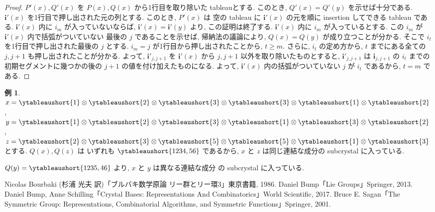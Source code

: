 \documentclass[
  a4paper, 
  12pt,
  ja=standard,
  xelatex,
  left=30truemm,
  right=30truemm,
  titlepage 
]{bxjsarticle}
\theoremstyle{definition}
\newtheorem*{ex}{例}
\begin{document}
\begin{proof}
  $P'(x), Q'(x)$ を $P(x), Q(x)$ から1行目を取り除いた tableauとする. このとき, $Q'(x) = Q'(y)$ を示せば十分である.
  $\mathbf{i}'(x)$ を1行目で押し出された元の列とする. このとき, $P'(x)$ は 空の tableau に $\mathbf{i}'(x)$ の元を順に
  insertion してできる tableau である. $\mathbf{i}'(x)$ 内に $i_m$ が入っていないならば, $\mathbf{i}'(x) = \mathbf{i}'(y)$
  より, この証明は終了する. $\mathbf{i}'(x)$ 内に $i_m$ が入っているとする. この $i_m$ が $\mathbf{i}'(x)$ 内で括弧がついていない
  最後の $j$ であることを示せば, 帰納法の議論により, $Q(x) = Q(y)$ が成り立つことが分かる.
  そこで $i_t$ を1行目で押し出された最後の $j$ とする. $i_m = j$ が1行目から押し出されたことから, $t \geq m$.
  さらに, $i_t$ の定め方から, $t$ までにある全ての $j, j + 1$ も押し出されたことが分かる.
  よって, $\mathbf{i}'_{j, j + 1}$ を $\mathbf{i}'(x)$ から $j, j + 1$ 以外を取り除いたものとすると, $\mathbf{i}'_{j, j + 1}$ は
  $\mathbf{i}_{j, j + 1}$ の $i_t$ までの初期セグメントに幾つかの後の $j + 1$ の値を付け加えたものになる.
  よって, $\mathbf{i}'(x)$ 内の括弧がついていない $j$ が $i_t$ であるから, $t = m$ である.
\end{proof}

\begin{ex}
  $x = \ytableaushort{1} \otimes \ytableaushort{2} \otimes \ytableaushort{3} \otimes \ytableaushort{3} \otimes \ytableaushort{1} \otimes \ytableaushort{2}$,
  $y = \ytableaushort{1} \otimes \ytableaushort{2} \otimes \ytableaushort{3} \otimes \ytableaushort{1} \otimes \ytableaushort{3} \otimes \ytableaushort{2}$,
  $z = \ytableaushort{2} \otimes \ytableaushort{3} \otimes \ytableaushort{5} \otimes \ytableaushort{5} \otimes \ytableaushort{1} \otimes \ytableaushort{3}$
  とする.
  $Q(x), Q(z)$ は いずれも $\ytableaushort{1234,56}$ であるから, $x$ と $z$ は同じ連結な成分の subcrystal に入っている.

  $Q(y) = \ytableaushort{1235,46}$ より, $x$ と $y$ は異なる連結な成分 の subcrystal に入っている.
\end{ex}

\begin{thebibliography}{99}
   Nicolas Bourbaki (杉浦 光夫 訳)「ブルバキ数学原論 リー群とリー環3」東京書籍, 1986.
   Daniel Bump「Lie Groups」Springer, 2013.
   Daniel Bump, Anne Schilling「Crystal Bases: Representations And Combinatorics」World Scientific, 2017.
   Bruce E. Sagan「The Symmetric Group: Representations, Combinatorial Algorithms, and Symmetric Functions」Springer, 2001.
\end{thebibliography}
\end{document}
